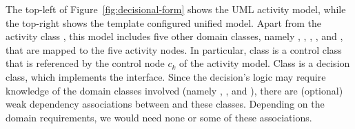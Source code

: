 {%
%
%
%
%

%
The top-left of Figure~\ref{fig:decisional-form} shows the UML activity model, while the top-right shows the template configured unified model. Apart from the activity class , this model includes five other domain classes, namely , , , , and , that are mapped to the five activity nodes. In particular, class  is a control class that is referenced by the control node $c_k$ of the activity model. 
Class  is a decision class, which implements the  interface.
%
Since the decision's logic may require knowledge of the domain classes involved (namely , , and ), there are (optional) weak dependency associations between  and these classes. Depending on the domain requirements, we would need none or some of these associations.

}
